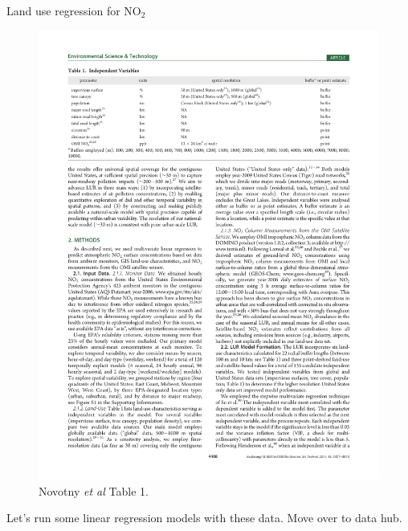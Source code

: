 \documentclass[aspectratio=169]{beamer}
\begin{document}
\begin{frame}{Land use regression for NO$_2$}
\begin{figure}
\includegraphics[height=0.6\textheight]{novotny_tab1_4}
\caption*{Novotny \textit{et al} Table 1.  }
\end{figure}

\end{frame}


\begin{frame}{}
	Let's run some linear regression models with these data.  Move over to data hub.

\end{frame}

	
\end{document}
